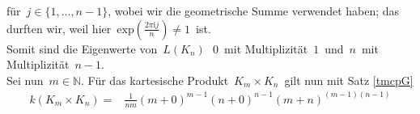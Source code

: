 für $\,j\in\{1,\ldots,n-1\}$,\; wobei wir die geometrische Summe verwendet haben; das durften wir, weil hier $\,\mathrm{exp}{\left(\frac{2\pi \mathrm{i}j}{n}\right)} \neq 1\,$ ist.\\
Somit sind die Eigenwerte von $\,L(K_n)\,$ $\,0\,$ mit Multiplizität $\,1\,$ und $\,n\,$ mit Multiplizität $\,n-1$.\; \\
Sei nun $\,m\in\mathbb{N}$.\; 
Für das kartesische Produkt $\,K_m\times K_n\,$ gilt nun mit Satz \ref{tmcpG}
\begin{equation*}
 \begin{split}
  \mathit{k}(K_m\times K_n)={}&\frac{1}{nm}(m+0)^{m-1}(n+0)^{n-1}(m+n)^{(m-1)(n-1)}
 \end{split}
\end{equation*}
